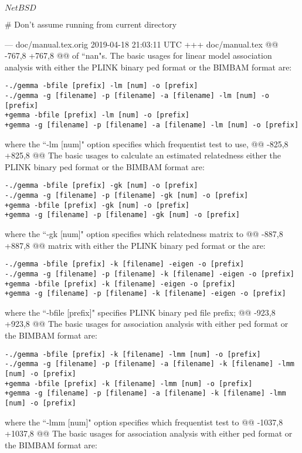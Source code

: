$NetBSD$

# Don't assume running from current directory

--- doc/manual.tex.orig	2019-04-18 21:03:11 UTC
+++ doc/manual.tex
@@ -767,8 +767,8 @@ of ``nan"s.
 The basic usages for linear model association analysis with either the PLINK binary ped format or the BIMBAM format are:
 
 \begin{verbatim}
-./gemma -bfile [prefix] -lm [num] -o [prefix]
-./gemma -g [filename] -p [filename] -a [filename] -lm [num] -o [prefix]
+gemma -bfile [prefix] -lm [num] -o [prefix]
+gemma -g [filename] -p [filename] -a [filename] -lm [num] -o [prefix]
 \end{verbatim}
 
 where the ``-lm [num]" option specifies which frequentist test to use,
@@ -825,8 +825,8 @@ The basic usages to calculate an estimated relatedness
 either the PLINK binary ped format or the BIMBAM format are:
 \begin{verbatim}
-./gemma -bfile [prefix] -gk [num] -o [prefix]
-./gemma -g [filename] -p [filename] -gk [num] -o [prefix]
+gemma -bfile [prefix] -gk [num] -o [prefix]
+gemma -g [filename] -p [filename] -gk [num] -o [prefix]
 \end{verbatim}
 where the ``-gk [num]" option specifies which relatedness matrix to
@@ -887,8 +887,8 @@ matrix with either the PLINK binary ped format or the 
 are:
 \begin{verbatim}
-./gemma -bfile [prefix] -k [filename] -eigen -o [prefix]
-./gemma -g [filename] -p [filename] -k [filename] -eigen -o [prefix]
+gemma -bfile [prefix] -k [filename] -eigen -o [prefix]
+gemma -g [filename] -p [filename] -k [filename] -eigen -o [prefix]
 \end{verbatim}
 where the ``-bfile [prefix]" specifies PLINK binary ped file prefix;
@@ -923,8 +923,8 @@ The basic usages for association analysis with either 
 ped format or the BIMBAM format are:
 
 \begin{verbatim}
-./gemma -bfile [prefix] -k [filename] -lmm [num] -o [prefix]
-./gemma -g [filename] -p [filename] -a [filename] -k [filename] -lmm [num] -o [prefix]
+gemma -bfile [prefix] -k [filename] -lmm [num] -o [prefix]
+gemma -g [filename] -p [filename] -a [filename] -k [filename] -lmm [num] -o [prefix]
 \end{verbatim}
 
 where the ``-lmm [num]" option specifies which frequentist test to
@@ -1037,8 +1037,8 @@ The basic usages for association analysis with either 
 ped format or the BIMBAM format are:
 
